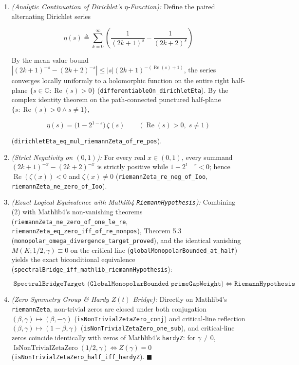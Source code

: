 \documentclass[
  11pt,
]{article}
\begin{document}
\begin{enumerate}
\def\labelenumi{\arabic{enumi}.}
\item
  \emph{(Analytic Continuation of Dirichlet's \(\eta\)-Function):}
  Define the paired alternating Dirichlet series

  \[\eta(s) \triangleq \sum_{k=0}^{\infty} \left(\frac{1}{(2k+1)^s} - \frac{1}{(2k+2)^s}\right)\]

  By the mean-value bound
  \(\left|(2k+1)^{-s} - (2k+2)^{-s}\right| \le |s|(2k+1)^{-(\operatorname{Re}(s)+1)}\),
  the series converges locally uniformly to a holomorphic function on
  the entire right half-plane
  \(\{s \in \mathbb{C} : \operatorname{Re}(s) > 0\}\)
  (\texttt{differentiableOn\_dirichletEta}). By the complex identity
  theorem on the path-connected punctured half-plane
  \(\{s : \operatorname{Re}(s) > 0 \land s \neq 1\}\),

  \[\eta(s) = \big(1 - 2^{1-s}\big)\,\zeta(s) \qquad (\operatorname{Re}(s) > 0,\; s \neq 1)\]

  (\texttt{dirichletEta\_eq\_mul\_riemannZeta\_of\_re\_pos}).
\item
  \emph{(Strict Negativity on \((0, 1)\)):} For every real
  \(x \in (0, 1)\), every summand \((2k+1)^{-x} - (2k+2)^{-x}\) is
  strictly positive while \(1 - 2^{1-x} < 0\); hence
  \(\operatorname{Re}(\zeta(x)) < 0\) and \(\zeta(x) \neq 0\)
  (\texttt{riemannZeta\_re\_neg\_of\_Ioo},
  \texttt{riemannZeta\_ne\_zero\_of\_Ioo}).
\item
  \emph{(Exact Logical Equivalence with Mathlib4
  \texttt{RiemannHypothesis}):} Combining (2) with Mathlib4's
  non-vanishing theorems
  (\texttt{riemannZeta\_ne\_zero\_of\_one\_le\_re},
  \texttt{riemannZeta\_eq\_zero\_iff\_of\_re\_nonpos}), Theorem 5.3
  (\texttt{monopolar\_omega\_divergence\_target\_proved}), and the
  identical vanishing \(M(K; 1/2, \gamma) \equiv 0\) on the critical
  line (\texttt{globalMonopolarBounded\_at\_half}) yields the exact
  biconditional equivalence
  (\texttt{spectralBridge\_iff\_mathlib\_riemannHypothesis}):

  \[\texttt{SpectralBridgeTarget (GlobalMonopolarBounded primeGapWeight)} \;\Longleftrightarrow\; \texttt{RiemannHypothesis}\]
\item
  \emph{(Zero Symmetry Group \& Hardy \(Z(t)\) Bridge):} Directly on
  Mathlib4's \texttt{riemannZeta}, non-trivial zeros are closed under
  both conjugation \((\beta, \gamma) \mapsto (\beta, -\gamma)\)
  (\texttt{isNonTrivialZetaZero\_conj}) and critical-line reflection
  \((\beta, \gamma) \mapsto (1-\beta, \gamma)\)
  (\texttt{isNonTrivialZetaZero\_one\_sub}), and critical-line zeros
  coincide identically with zeros of Mathlib4's \texttt{hardyZ}: for
  \(\gamma \neq 0\),
  \(\operatorname{IsNonTrivialZetaZero}(1/2, \gamma) \iff Z(\gamma) = 0\)
  (\texttt{isNonTrivialZetaZero\_half\_iff\_hardyZ}). \(\blacksquare\)
\end{enumerate}
\end{document}
